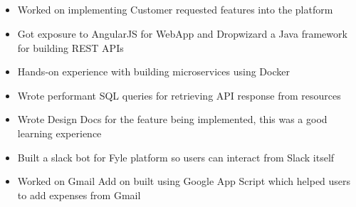 \documentclass[10pt,a4paper]{altacv}
\begin{document}

\makecvheader

\\

\divider\smallskip

\\

\divider\smallskip

\\

\divider\smallskip

\\


\begin{itemize}
\item Worked on implementing Customer requested features into the platform
\item Got exposure to AngularJS for WebApp and Dropwizard a Java framework for building REST APIs
\item Hands-on experience with building microservices using Docker
\item Wrote performant SQL queries for retrieving API response from resources
\item Wrote Design Docs for the feature being implemented, this was a good learning experience
\item Built a slack bot for Fyle platform so users can interact from Slack itself
\item Worked on Gmail Add on built using Google App Script which helped users to add expenses from Gmail
\end{itemize}

\divider\smallskip
\end{document}
